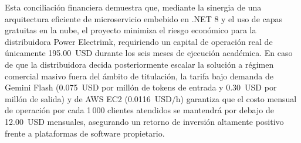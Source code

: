 Esta conciliación financiera demuestra que, mediante la sinergia de una arquitectura eficiente de microservicio embebido en .NET 8 y el uso de capas gratuitas en la nube, el proyecto minimiza el riesgo económico para la distribuidora Power Electrimk, requiriendo un capital de operación real de únicamente 195.00~USD durante los seis meses de ejecución académica. En caso de que la distribuidora decida posteriormente escalar la solución a régimen comercial masivo fuera del ámbito de titulación, la tarifa bajo demanda de Gemini Flash (0.075~USD por millón de tokens de entrada y 0.30~USD por millón de salida) y de AWS EC2 (0.0116~USD/h) garantiza que el costo mensual de operación por cada 1\,000 clientes atendidos se mantendrá por debajo de 12.00~USD mensuales, asegurando un retorno de inversión altamente positivo frente a plataformas de software propietario.
